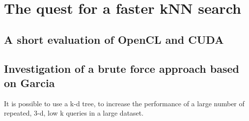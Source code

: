 
\chapter{The quest for a faster kNN search} %
\label{sec:the_quest_for_a_faster_knn_search}

\section{A short evaluation of OpenCL and CUDA} %
\label{sub:a_short_evaluation_of_opencl_and_cuda}


\section{Investigation of a brute force approach based on Garcia} %
\label{sub:investigation_of_a_brute_force_approach_based_on_garcia}


\begin{myrq}
\label{rq:structure_aml}
    It is possible to use a k-d tree, to increase the performance of a large number of repeated, 3-d, low k queries in a large dataset.
\end{myrq}





